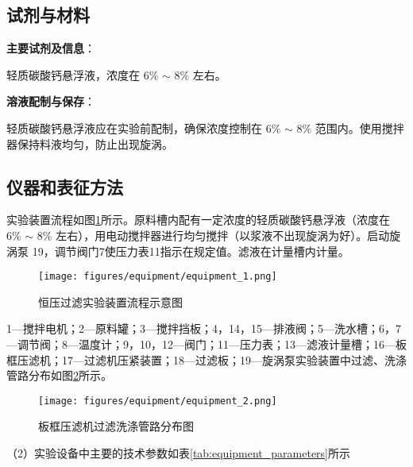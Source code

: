 \subsection{试剂与材料}


\noindent\textbf{主要试剂及信息}：

轻质碳酸钙悬浮液，浓度在 $6\%$ $\sim$ $8\%$ 左右。

\noindent\textbf{溶液配制与保存}：

轻质碳酸钙悬浮液应在实验前配制，确保浓度控制在 $6\%$ $\sim$ $8\%$ 范围内。使用搅拌器保持料液均匀，防止出现旋涡。

\subsection{仪器和表征方法}


实验装置流程如图\ref{fig:equipment_1}所示。原料槽内配有一定浓度的轻质碳酸钙悬浮液（浓度在 $6\%$ $\sim$ $8\%$ 左右），用电动搅拌器进行均匀搅拌（以浆液不出现旋涡为好）。启动旋涡泵 19，调节阀门7使压力表11指示在规定值。滤液在计量槽内计量。

\begin{figure}[H]
    \centering
    \texttt{[image: figures/equipment/equipment\_1.png]}
    \caption{恒压过滤实验装置流程示意图}
    \label{fig:equipment_1}
\end{figure}

1—搅拌电机；2—原料罐；3—搅拌挡板；4，14，15—排液阀；5—洗水槽；6，7—调节阀；8—温度计；9，10，12—阀门；11—压力表；13—滤液计量槽；16—板框压滤机；17—过滤机压紧装置；18—过滤板；19—旋涡泵实验装置中过滤、洗涤管路分布如图\ref{fig:equipment_2}所示。

\begin{figure}[H]
    \centering
    \texttt{[image: figures/equipment/equipment\_2.png]}
    \caption{板框压滤机过滤洗涤管路分布图}
    \label{fig:equipment_2}
\end{figure}

（2）实验设备中主要的技术参数如表\ref{tab:equipment_parameters}所示

